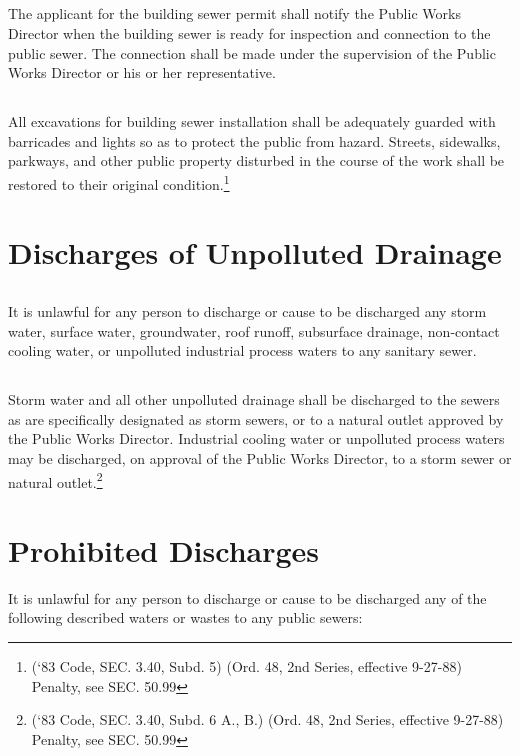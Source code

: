 \subsection{}
The applicant for the building sewer permit shall notify the Public Works Director when the building sewer is ready for inspection and connection to the public sewer.  The connection shall be made under the supervision of the Public Works Director or his or her representative.
\subsection{}
All excavations for building sewer installation shall be adequately guarded with barricades and lights so as to protect the public from hazard.  Streets, sidewalks, parkways, and other public property disturbed in the course of the work shall be restored to their original condition.\footnote{(‘83 Code, SEC. 3.40, Subd. 5) (Ord. 48, 2nd Series, effective 9-27-88) Penalty, see SEC. 50.99}

\section{Discharges of Unpolluted Drainage}
\subsection{}
It is unlawful for any person to discharge or cause to be discharged any storm water, surface water, groundwater, roof runoff, subsurface drainage, non-contact cooling water, or unpolluted industrial process waters to any sanitary sewer.
\subsection{}
Storm water and all other unpolluted drainage shall be discharged to the sewers as are specifically designated as storm sewers, or to a natural outlet approved by the Public Works Director.  Industrial cooling water or unpolluted process waters may be discharged, on approval of the Public Works Director, to a storm sewer or natural outlet.\footnote{(‘83 Code, SEC. 3.40, Subd. 6 A., B.) (Ord. 48, 2nd Series, effective 9-27-88) Penalty, see SEC. 50.99}

\section{Prohibited Discharges}
It is unlawful for any person to discharge or cause to be discharged any of the following described waters or wastes to any public sewers:
